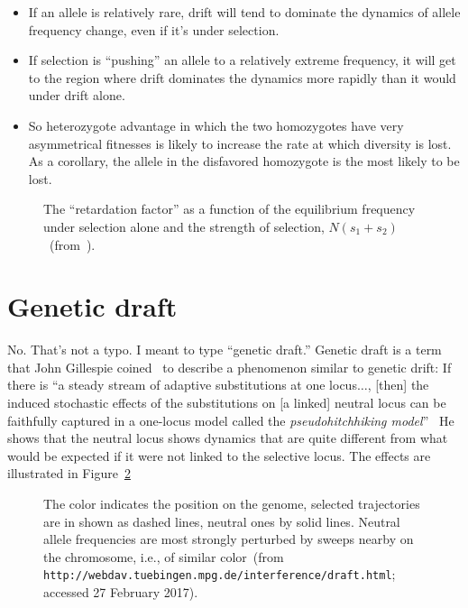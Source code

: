 \documentclass[12pt]{article}
\begin{document}
\begin{itemize}

\item If an allele is relatively rare, drift will tend to dominate the
  dynamics of allele frequency change, even if it's under selection.

\item If selection is ``pushing'' an allele to a relatively extreme
  frequency, it will get to the region where drift dominates the
  dynamics more rapidly than it would under drift alone.

\item So heterozygote advantage in which the two homozygotes have very
  asymmetrical fitnesses is likely to increase the rate at which
  diversity is lost. As a corollary, the allele in the disfavored
  homozygote is the most likely to be lost.

\end{itemize}

\begin{figure}
\begin{center}
\end{center}
\caption{The ``retardation factor'' as a function of the equilibrium
  frequency under selection alone and the strength of selection,
  $N(s_1+s_2)$~(from~\cite{Robertson-1962}).}\label{fig:drift-heterozygote-advantage} 
\end{figure}

\section*{Genetic draft}

No. That's not a typo. I meant to type ``genetic draft.'' Genetic
draft is a term that John Gillespie coined~\cite{Gillespie-2000} to
describe a phenomenon similar to genetic drift: If there is ``a steady
stream of adaptive substitutions at one locus$\dots$, [then] the
induced stochastic effects of the substitutions on [a linked] neutral
locus can be faithfully captured in a one-locus model called the {\it
  pseudohitchhiking model}''~\cite[p. 909]{Gillespie-2000} He shows
that the neutral locus shows dynamics that are quite different from
what would be expected if it were not linked to the selective
locus. The effects are illustrated in Figure~\ref{fig:genetic-draft}

\begin{figure}
\begin{center}
\end{center}
\caption{The color indicates the position on the genome, selected
  trajectories are in shown as dashed lines, neutral ones by solid
  lines. Neutral allele frequencies are most strongly perturbed by
  sweeps nearby on the chromosome, i.e., of similar color~(from
  {\tt http://webdav.tuebingen.mpg.de/interference/draft.html};
  accessed 27 February 2017).}\label{fig:genetic-draft}  
\end{figure}
\end{document}

